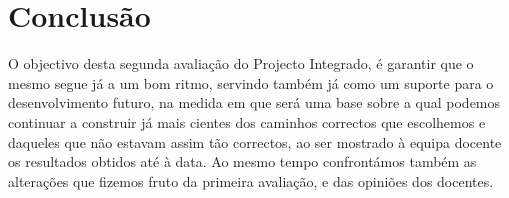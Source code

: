 \documentclass[a4paper,11pt,openright,openbib]{article}
\begin{document}
\section{Conclusão}
O objectivo desta segunda avaliação do Projecto Integrado, é garantir que o mesmo segue já a um bom ritmo, servindo também já como um suporte para o desenvolvimento futuro, na medida em que será uma base sobre a qual podemos continuar a construir já mais cientes dos caminhos correctos que escolhemos e daqueles que não estavam assim tão correctos, ao ser mostrado à equipa docente os resultados obtidos até à data. Ao mesmo tempo confrontámos também as alterações que fizemos fruto da primeira avaliação, e das opiniões dos docentes.
\end{document}
